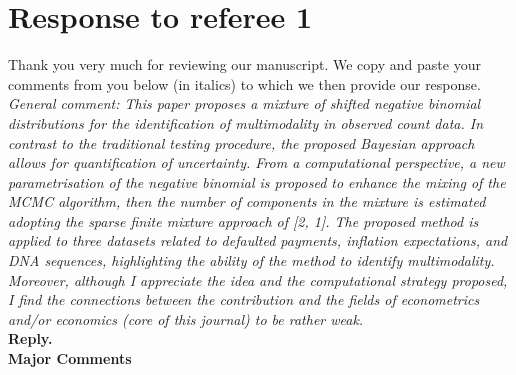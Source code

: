 \documentclass[12pt]{article}
\begin{document}
\section*{Response to referee 1}

Thank you very much for reviewing  our manuscript. We copy and paste your comments from you below (in italics) to which we then provide our response.\\


\textit{General comment: This paper proposes a mixture of shifted negative binomial distributions for the identification of multimodality in observed count data. In contrast to the traditional testing procedure, the proposed Bayesian approach allows for quantification of uncertainty. From a computational perspective, a new parametrisation of the negative binomial is proposed to enhance the mixing of the MCMC algorithm, then the number of components in the mixture is estimated adopting the sparse finite mixture approach of [2, 1]. The proposed method is applied to three datasets related to defaulted payments, inflation expectations, and DNA sequences, highlighting the ability of the method to identify multimodality. Moreover, although I appreciate the idea and the computational strategy proposed, I find the connections between the contribution and the fields of econometrics and/or economics (core of this journal) to be rather weak.}\\

 \textbf{Reply.}  \\

\textbf{Major Comments}\\
\end{document}
